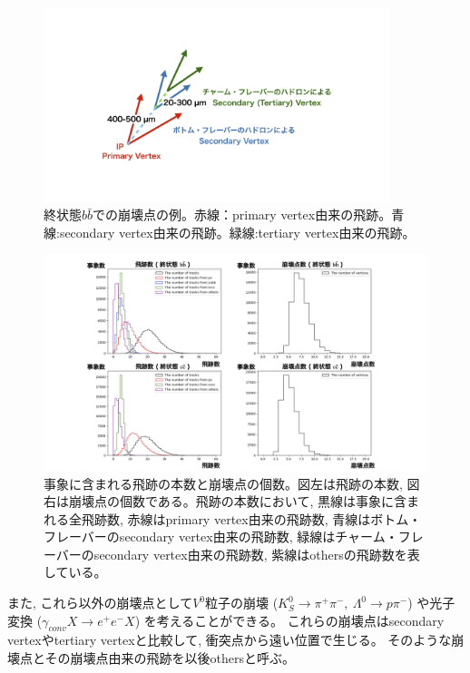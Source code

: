 \begin{figure}[htbp]
 \centering
 \includegraphics[trim = 200 230 200 230, width=0.9\textwidth, clip]{Figure/3Networks/3-1-1-1FinalStateBB.png}
 \caption[終状態$b\bar{b}$での崩壊点の例]{終状態$b\bar{b}$での崩壊点の例。赤線：primary vertex由来の飛跡。青線:secondary vertex由来の飛跡。緑線:tertiary vertex由来の飛跡。}
 \label{3-1-1-1FinalStateBB}
\end{figure}

\begin{figure}[htbp]
 \centering
 \includegraphics[trim = 150 0 150 0, width=1.0\textwidth, clip]{Figure/3Networks/3-1-1-2TracksandVertices.png}
 \caption[事象に含まれる飛跡の本数と崩壊点の個数]{事象に含まれる飛跡の本数と崩壊点の個数。図左は飛跡の本数, 図右は崩壊点の個数である。飛跡の本数において, 黒線は事象に含まれる全飛跡数, 赤線はprimary vertex由来の飛跡数, 青線はボトム・フレーバーのsecondary vertex由来の飛跡数, 緑線はチャーム・フレーバーのsecondary vertex由来の飛跡数, 紫線はothersの飛跡数を表している。}
 \label{3-1-1-2TracksandVertices}
\end{figure}

また, これら以外の崩壊点として$V^0$粒子の崩壊 ($K^0_S \to \pi^+\pi^-,\ \Lambda^0 \to p \pi^-$) や光子変換 ($\gamma_{conv} X \to e^+e^-X$) を考えることができる。
これらの崩壊点はsecondary vertexやtertiary vertexと比較して, 衝突点から遠い位置で生じる。
そのような崩壊点とその崩壊点由来の飛跡を以後othersと呼ぶ。

